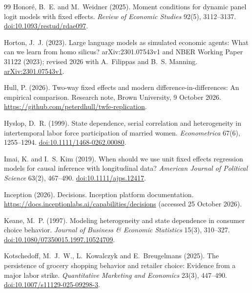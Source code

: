 \documentclass[11pt]{article}
\begin{document}
\begin{thebibliography}{99}
Honor{\'e}, B.~E. and M.~Weidner (2025).
Moment conditions for dynamic panel logit models with fixed effects.
\emph{Review of Economic Studies} 92(5), 3112--3137.
\href{https://doi.org/10.1093/restud/rdae097}{doi:10.1093/restud/rdae097}.

Horton, J.~J. (2023).
Large language models as simulated economic agents: What can we learn from homo silicus?
arXiv:2301.07543v1 and NBER Working Paper 31122 (2023); revised 2026 with A.~Filippas and
B.~S. Manning.
\href{https://arxiv.org/abs/2301.07543v1}{arXiv:2301.07543v1}.

Hull, P. (2026).
Two-way fixed effects and modern difference-in-differences: An empirical comparison.
Research note, Brown University, 9 October 2026.
\url{https://github.com/peterdhull/twfe-replication}.

Hyslop, D.~R. (1999).
State dependence, serial correlation and heterogeneity in intertemporal labor force participation
of married women.
\emph{Econometrica} 67(6), 1255--1294.
\href{https://doi.org/10.1111/1468-0262.00080}{doi:10.1111/1468-0262.00080}.

Imai, K. and I.~S. Kim (2019).
When should we use unit fixed effects regression models for causal inference with longitudinal
data?
\emph{American Journal of Political Science} 63(2), 467--490.
\href{https://doi.org/10.1111/ajps.12417}{doi:10.1111/ajps.12417}.

Inception (2026).
Decisions. Inception platform documentation.
\url{https://docs.inceptionlabs.ai/capabilities/decisions} (accessed 25 October 2026).

Keane, M.~P. (1997).
Modeling heterogeneity and state dependence in consumer choice behavior.
\emph{Journal of Business \& Economic Statistics} 15(3), 310--327.
\href{https://doi.org/10.1080/07350015.1997.10524709}{doi:10.1080/07350015.1997.10524709}.

Kotschedoff, M.~J.~W., L.~Kowalczyk and E.~Breugelmans (2025).
The persistence of grocery shopping behavior and retailer choice: Evidence from a major labor
strike.
\emph{Quantitative Marketing and Economics} 23(3), 447--490.
\href{https://doi.org/10.1007/s11129-025-09298-3}{doi:10.1007/s11129-025-09298-3}.


\end{thebibliography}
\end{document}
